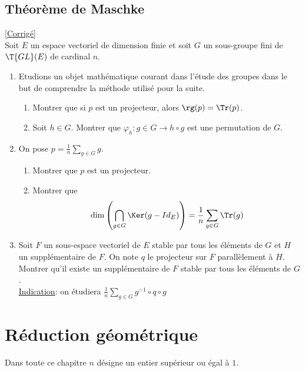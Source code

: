 \documentclass[8pt]{book}
\begin{document}
\section{Théorème de Maschke}
\label{Théorème de Maschke}
\textcolor{blue}{\hyperref[Théorème de Maschke corrigé]{[Corrigé]}}\\
Soit $E$ un espace vectoriel de dimension finie et soit $G$ un sous-groupe fini de $\T{GL}(E)$ de cardinal $n$.
\begin{enumerate}
	\item Etudions un objet mathématique courant dans l'étude des groupes dans le but de comprendre la méthode utilisé pour la suite.
	\begin{enumerate}[label=\alph*.]
		\item Montrer que si $p$ est un projecteur, alors $\rg(p)=\Tr(p)$.
		\item Soit $h\in G$. Montrer que $\varphi_h:g\in G\to h\circ g$ est une permutation de $G$.
	\end{enumerate}
	\item On pose $\displaystyle p=\frac{1}{n}\sum_{g\in G}g$.
	\begin{enumerate}[label=\alph*.]
		\item Montrer que $p$ est un projecteur.
		\item Montrer que $$\dim\left(\bigcap_{g\in G}\Ker(g-Id_E)\right)=\frac{1}{n}\sum_{g\in G}\Tr(g)$$
	\end{enumerate}
	\item Soit $F$ un sous-espace vectoriel de $E$ stable par tous les éléments de $G$ et $H$ un supplémentaire de $F$. On note $q$ le projecteur sur $F$ parallèlement à $H$.
	\\ Montrer qu'il existe un supplémentaire de $F$ stable par tous les éléments de $G$.
	\\ \underline{Indication}: on étudiera $\displaystyle \frac{1}{n}\sum_{g\in G}g^{-1}\circ q\circ g$
\end{enumerate}
	
\chapter{Réduction géométrique}
	Dans toute ce chapitre $n$ désigne un entier supérieur ou égal à $1$.
\end{document}
